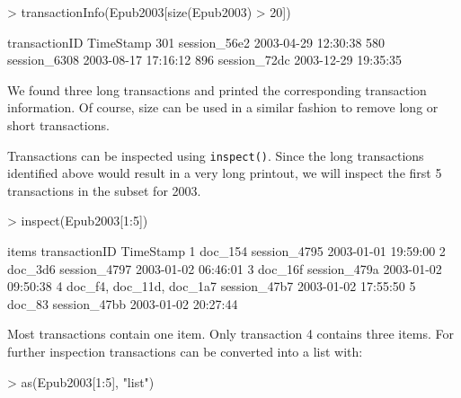 \documentclass[10pt,a4paper]{article}
\newcommand{\func}[1]{\mbox{\texttt{#1()}}}
\begin{document}
\begin{Schunk}
\begin{Sinput}
> transactionInfo(Epub2003[size(Epub2003) > 20])
\end{Sinput}
\begin{Soutput}
    transactionID           TimeStamp
301  session_56e2 2003-04-29 12:30:38
580  session_6308 2003-08-17 17:16:12
896  session_72dc 2003-12-29 19:35:35
\end{Soutput}
\end{Schunk}

We found three long transactions and printed the corresponding
transaction information. Of course, size can be used in a similar
fashion to remove long or short transactions.

Transactions can be inspected using \func{inspect}. 
Since the long transactions identified above would result in
a very long printout, we will inspect 
the first 5 transactions in the subset for 2003.

\begin{Schunk}
\begin{Sinput}
> inspect(Epub2003[1:5])
\end{Sinput}
\begin{Soutput}
  items     transactionID           TimeStamp
1 {doc_154}  session_4795 2003-01-01 19:59:00
2 {doc_3d6}  session_4797 2003-01-02 06:46:01
3 {doc_16f}  session_479a 2003-01-02 09:50:38
4 {doc_f4,                                   
   doc_11d,                                  
   doc_1a7}  session_47b7 2003-01-02 17:55:50
5 {doc_83}   session_47bb 2003-01-02 20:27:44
\end{Soutput}
\end{Schunk}

Most transactions contain one item. Only transaction 4 contains three items. 
For further inspection transactions can be converted into a list with:

\begin{Schunk}
\begin{Sinput}
> as(Epub2003[1:5], "list")
\end{Sinput}
\end{Schunk}
\end{document}
